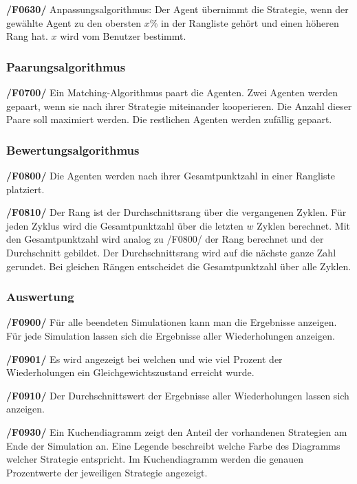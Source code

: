 \textbf{/F0630/}
Anpassungsalgorithmus: Der Agent übernimmt die Strategie, wenn der gewählte Agent zu den obersten $x\%$ in der Rangliste gehört und einen höheren Rang hat. $x$ wird vom Benutzer bestimmt.


\subsubsection{Paarungsalgorithmus}

\textbf{/F0700/}
Ein Matching-Algorithmus paart die Agenten. Zwei Agenten werden gepaart, wenn sie nach ihrer Strategie miteinander kooperieren. Die Anzahl dieser Paare soll maximiert werden. Die restlichen Agenten werden zufällig gepaart.

\subsubsection{Bewertungsalgorithmus}

\textbf{/F0800/}
Die Agenten werden nach ihrer Gesamtpunktzahl in einer Rangliste platziert.

\textbf{/F0810/}
Der Rang ist der Durchschnittsrang über die vergangenen Zyklen. Für jeden Zyklus wird die Gesamtpunktzahl über die letzten $w$ Zyklen berechnet. Mit den Gesamtpunktzahl wird analog zu /F0800/ der Rang berechnet und der Durchschnitt gebildet. Der Durchschnittsrang wird auf die nächste ganze Zahl gerundet. Bei gleichen Rängen entscheidet die Gesamtpunktzahl über alle Zyklen.

\subsubsection{Auswertung}

\textbf{/F0900/}
Für alle beendeten Simulationen kann man die Ergebnisse anzeigen. Für jede Simulation lassen sich die Ergebnisse aller Wiederholungen anzeigen.

{\color{red}
\textbf{/F0901/}
Es wird angezeigt bei welchen und wie viel Prozent der Wiederholungen ein Gleichgewichtszustand erreicht wurde.
}

\textbf{/F0910/}
Der Durchschnittswert der Ergebnisse aller Wiederholungen lassen sich anzeigen.

\textbf{/F0930/}
Ein Kuchendiagramm zeigt den Anteil der vorhandenen Strategien {\color{red}am Ende der Simulation an. Eine Legende beschreibt welche Farbe des Diagramms welcher Strategie entspricht. Im Kuchendiagramm werden die genauen Prozentwerte der jeweiligen Strategie angezeigt.} 

